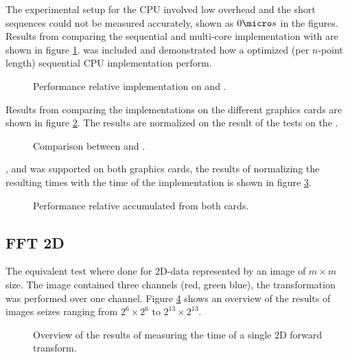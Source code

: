 The experimental setup for the CPU involved low overhead and the short sequences could not be measured accurately, shown as $0{\micro}s$ in the figures. Results from comparing the sequential {\CPP} and multi-core {\OMP} implementation with {\CU} are shown in figure \ref{fig:gtx:cpu}. {\FFTW} was included and demonstrated how a optimized (per $n$-point length) sequential CPU implementation perform.

\begin{figure}[!htbp]
	\centering
	
	\caption{Performance relative {\CU} implementation on {\NVCARD} and {\INTELCPU}.}
	\label{fig:gtx:cpu}
\end{figure}

Results from comparing the implementations on the different graphics cards are shown in figure \ref{fig:gpu-comparison}. The results are normalized on the result of the tests on the {\NVCARD}.

\begin{figure}[!htbp]
	\centering
	
	\caption{Comparison between {\AMDCARD} and {\NVCARD}.}
	\label{fig:gpu-comparison}
\end{figure}

{\DX}, {\GL} and {\OCL} was supported on both graphics cards, the results of normalizing the resulting times with the time of the {\OCL} implementation is shown in figure \ref{fig:gpu-comparison-tech}.

\begin{figure}[!htbp]
	\centering
	
	\caption{Performance relative {\OCL} accumulated from both cards.}
	\label{fig:gpu-comparison-tech}
\end{figure}


\newpage

\subsection{FFT 2D}

The equivalent test where done for 2D-data represented by an image of $m{\times}m$ size. The image contained three channels (red, green blue), the transformation was performed over one channel. Figure \ref{fig:gpu:overview-2d} shows an overview of the results of images seizes ranging from $2^{6}{\times}2^{6}$ to $2^{13}{\times}2^{13}$.

\begin{figure}[!htbp]
	\centering
	\subfloat[\NVCARD]{	
		
	}
	\vfill
	\subfloat[\AMDCARD]{
		
	}
	\caption{Overview of the results of measuring the time of a single 2D forward transform.}
	\label{fig:gpu:overview-2d}
\end{figure}

